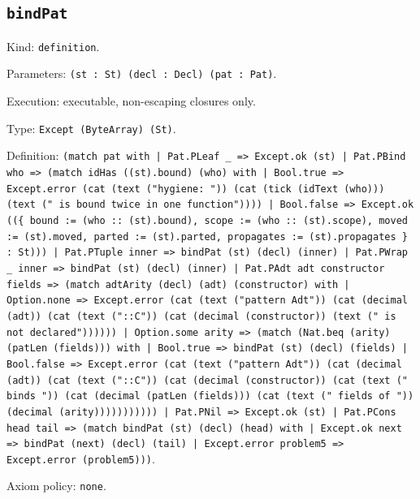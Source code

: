 \documentclass[11pt]{article}
\begin{document}
\subsection*{\texttt{bindPat}}
\noindent Kind: \texttt{definition}.\par
\noindent Parameters: \texttt{(st : St) (decl : Decl) (pat : Pat)}.\par
\noindent Execution: executable, non-escaping closures only.\par
\noindent Type: \texttt{Except (ByteArray) (St)}.\par
\noindent Definition: \texttt{(match pat with | Pat.PLeaf \_ => Except.ok (st) | Pat.PBind who => (match idHas ((st).bound) (who) with | Bool.true => Except.error (cat (text ("hygiene: ")) (cat (tick (idText (who))) (text (" is bound twice in one function")))) | Bool.false => Except.ok ((\{ bound := (who :: (st).bound), scope := (who :: (st).scope), moved := (st).moved, parted := (st).parted, propagates := (st).propagates \} : St))) | Pat.PTuple inner => bindPat (st) (decl) (inner) | Pat.PWrap \_ inner => bindPat (st) (decl) (inner) | Pat.PAdt adt constructor fields => (match adtArity (decl) (adt) (constructor) with | Option.none => Except.error (cat (text ("pattern Adt")) (cat (decimal (adt)) (cat (text ("::C")) (cat (decimal (constructor)) (text (" is not declared")))))) | Option.some arity => (match (Nat.beq (arity) (patLen (fields))) with | Bool.true => bindPat (st) (decl) (fields) | Bool.false => Except.error (cat (text ("pattern Adt")) (cat (decimal (adt)) (cat (text ("::C")) (cat (decimal (constructor)) (cat (text (" binds ")) (cat (decimal (patLen (fields))) (cat (text (" fields of ")) (decimal (arity))))))))))) | Pat.PNil => Except.ok (st) | Pat.PCons head tail => (match bindPat (st) (decl) (head) with | Except.ok next => bindPat (next) (decl) (tail) | Except.error problem5 => Except.error (problem5)))}.\par
\noindent Axiom policy: \texttt{none}.\par
\end{document}
